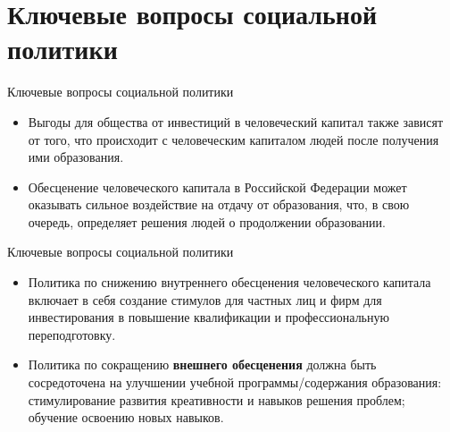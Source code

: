 \documentclass{beamer}
\begin{document}

\section*{Ключевые вопросы социальной политики}
\begin{frame}{Ключевые вопросы социальной политики}
	\fontsize{12}{14}\selectfont
	\begin{itemize}
	\item Выгоды для общества от инвестиций в человеческий капитал также зависят от того, что происходит с человеческим капиталом людей после получения ими образования. 
	\vspace{1cm}
	
	\item Обесценение человеческого капитала в Российской Федерации может оказывать сильное воздействие на отдачу от образования, что, в свою очередь, определяет решения людей о продолжении образовании.
	\end{itemize}
\end{frame}

\begin{frame}{Ключевые вопросы социальной политики}
	\fontsize{12}{14}\selectfont
	\begin{itemize}
		\item Политика по снижению внутреннего обесценения человеческого капитала включает в себя создание стимулов для частных лиц и фирм для инвестирования в повышение квалификации и профессиональную переподготовку.
		\vspace{1cm}
		
			
		\item Политика по сокращению \textbf{внешнего обесценения} должна быть сосредоточена на улучшении учебной программы/содержания образования: стимулирование развития креативности и навыков решения проблем; обучение освоению новых навыков.
	\end{itemize}
\end{frame}
\end{document}

